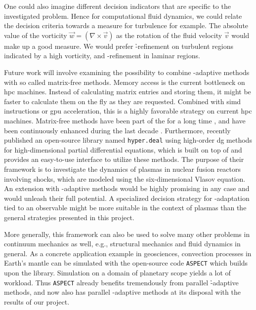 One could also imagine different decision indicators that are specific to the investigated problem. Hence for computational fluid dynamics, we could relate the decision criteria towards a measure for turbulence for example. The absolute value of the vorticity $\vec{w} = (\nabla \times \vec{v})$ as the rotation of the fluid velocity $\vec{v}$ would make up a good measure. We would prefer \h-refinement on turbulent regions indicated by a high vorticity, and \p-refinement in laminar regions.


Future work will involve examining the possibility to combine \hp-adaptive methods with so called matrix-free methods. Memory access is the current bottleneck on \gls{hpc} machines. Instead of calculating matrix entries and storing them, it might be faster to calculate them on the fly as they are requested. Combined with \gls{simd} instructions or \gls{gpu} acceleration, this is a highly favorable strategy on current \gls{hpc} machines. Matrix-free methods have been part of the \dealii{} for a long time \parencite{kronbichler2012}, and have been continuously enhanced during the last decade \parencite{kronbichler2019}. Furthermore, \textcite{munch2020} recently published an open-source library named \texttt{hyper.deal} using high-order \gls{dg} methods for high-dimensional partial differential equations, which is built on top of \dealii{} and provides an easy-to-use interface to utilize these methods. The purpose of their framework is to investigate the dynamics of plasmas in nuclear fusion reactors involving shocks, which are modeled using the six-dimensional Vlasov equation. An extension with \hp-adaptive methods would be highly promising in any case and would unleash their full potential. A specialized decision strategy for \hp-adaptation tied to an observable might be more suitable in the context of plasmas than the general strategies presented in this project.

More generally, this framework can also be used to solve many other problems in continuum mechanics as well, e.g., structural mechanics and fluid dynamics in general. As a concrete application example in geosciences, convection processes in Earth's mantle can be simulated with the open-source code \texttt{ASPECT} \parencite{kronbichler2012a,aspect210} which builds upon the \dealii{} library. Simulation on a domain of planetary scope yields a lot of workload. Thus \texttt{ASPECT} already benefits tremendously from parallel \h-adaptive methods, and now also has parallel \hp-adaptive methods at its disposal with the results of our project.


